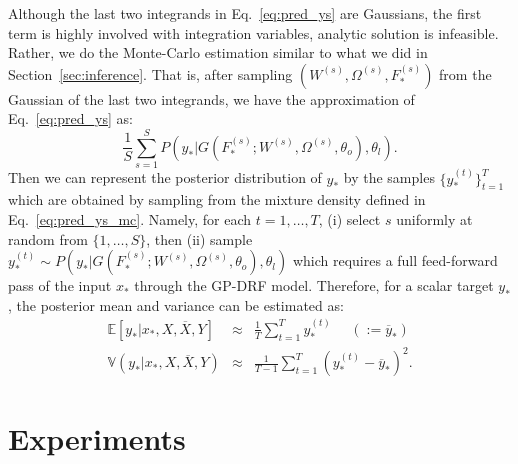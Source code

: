 \documentclass[conference]{IEEEtran}
\begin{document}
Although the last two integrands in Eq.~\ref{eq:pred_ys} are Gaussians, the 
first term is highly involved with integration variables, analytic solution 
is infeasible. Rather, we do the Monte-Carlo estimation similar to what we did 
in Section~\ref{sec:inference}. That is, after sampling $(W^{(s)}, \Omega^{(s)}, F^{(s)}_*)$ from the Gaussian of the last two integrands, we have the approximation of Eq.~\ref{eq:pred_ys} as:
\begin{equation}
\frac{1}{S} \sum_{s=1}^S 
    P(y_*|G(F^{(s)}_*; W^{(s)}, \Omega^{(s)}, \theta_o), \theta_l).
\label{eq:pred_ys_mc}
\end{equation}
Then we can represent the posterior distribution of $y_*$ by the samples 
$\{ y^{(t)}_* \}_{t=1}^T$ which are obtained by sampling from the mixture 
density defined in Eq.~\ref{eq:pred_ys_mc}. Namely, for each $t=1,\dots,T$, 
(i) select $s$ uniformly at random from $\{1,\dots,S\}$, then (ii) sample 
$y^{(t)}_* \sim P(y_*|G(F^{(s)}_*; W^{(s)}, \Omega^{(s)}, \theta_o), \theta_l)$ 
which requires a full feed-forward pass of the input $x_*$ through the 
GP-DRF model. Therefore, for a scalar target $y_*$, the posterior mean 
and variance can be estimated as:
\begin{eqnarray}
\mathbb{E}[y_*|x_*, X, \overline{X}, Y] &\approx& 
    \frac{1}{T} \sum_{t=1}^T y^{(t)}_* \ \ \ \ \ \ (:= \overline{y}_*) \\
\mathbb{V}(y_*|x_*, X, \overline{X}, Y) &\approx& 
    \frac{1}{T-1} \sum_{t=1}^T (y^{(t)}_*-\overline{y}_*)^2.
\end{eqnarray}

\section{Experiments}\label{sec:experiments}
\end{document}
